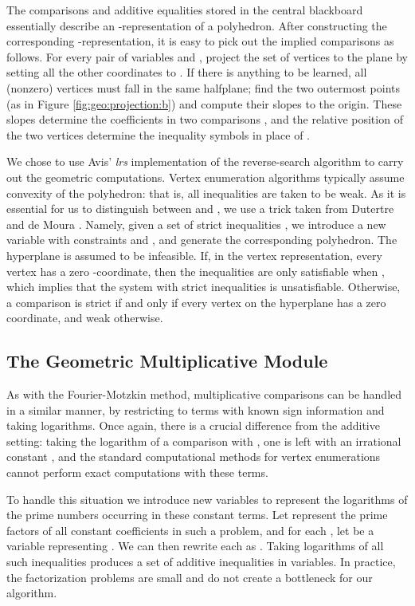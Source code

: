 \documentclass[runningheds]{llncs}
\begin{document}
The comparisons and additive equalities stored in the central
blackboard essentially describe an -representation of a
polyhedron. After constructing the corresponding
-representation, it is easy to pick out the implied
comparisons as follows. For every pair of variables  and ,
project the set of vertices to the  plane by setting all the other coordinates to . If there is anything to be learned, all (nonzero) vertices must fall in the same halfplane; find the two outermost points (as in Figure \ref{fig:geo:projection:b}) and compute their slopes to the origin. These slopes determine the coefficients  in two comparisons , and the relative position of the two vertices determine the inequality symbols in place of .



We chose to use Avis' \emph{lrs} implementation of the reverse-search
algorithm \cite{avis:00} to carry out the geometric computations.
Vertex enumeration algorithms typically assume convexity of the
polyhedron: that is, all inequalities are taken to be weak. As it is
essential for us to distinguish between  and , we use a trick
taken from Dutertre and de Moura \cite[Section
5]{dutertre:de:moura:06}. Namely, given a set of strict inequalities , we introduce a new
variable  with constraints  and , and generate the corresponding polyhedron. The  hyperplane is assumed to be infeasible.
If, in the vertex representation, every vertex has a zero -coordinate, then the inequalities are only satisfiable when , which implies that the system with strict inequalities is unsatisfiable. Otherwise, a comparison  is strict if and only if every vertex on the hyperplane  has a zero  coordinate, and weak otherwise.




\subsection{The Geometric Multiplicative Module}
\label{subsection:multiplicative:geometric}

As with the Fourier-Motzkin method, multiplicative comparisons  can be handled in a similar manner, by restricting to terms with known sign information and taking logarithms. Once again, there is a crucial difference from the additive setting: taking the logarithm of a comparison  with , one is left with an irrational constant , and the standard computational methods for vertex enumerations cannot perform exact computations with these terms.

To handle this situation we introduce new variables to represent the logarithms of the prime numbers occurring in these constant terms. Let  represent the prime factors of all constant coefficients in such a problem, and for each , let  be a variable representing . We can then rewrite each  as . Taking logarithms of all such inequalities produces a set of additive inequalities in  variables. In practice, the factorization problems are small and do not create a bottleneck for our algorithm.
\end{document}
